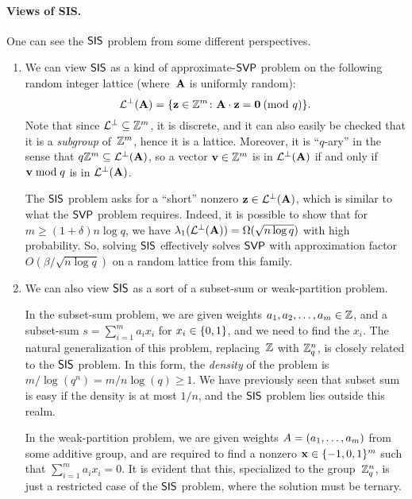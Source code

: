 \documentclass[11pt]{article}
\begin{document}
\paragraph{Views of SIS.}

One can see the $\mathsf{SIS}$ problem from some different perspectives.
\begin{enumerate}
\item We can view $\mathsf{SIS}$ as a kind of approximate-$\mathsf{SVP}$ problem on
  the following random integer lattice (where~$\mathbf{A}$ is uniformly
  random):
  \[ \latperp(\matA) = \set{\vecz \in \Z^{m} \colon \matA \cdot \vecz
      = \veczero \pmod*{q}} . \] Note that since
  $\mathcal{L}^{\perp} \subseteq \mathbb{Z}^{m}$, it is discrete, and it can also easily
  be checked that it is a \emph{subgroup} of~$\mathbb{Z}^{m}$, hence it is a
  lattice. Moreover, it is ``$q$-ary'' in the sense that
  $q\mathbb{Z}^{m} \subseteq \mathcal{L}^{\perp}(\mathbf{A})$, so a vector $\mathbf{v} \in \mathbb{Z}^{m}$
  is in $\mathcal{L}^{\perp}(\mathbf{A})$ if and only if $\mathbf{v} \bmod q$ is in
  $\mathcal{L}^{\perp}(\mathbf{A})$.

  The $\mathsf{SIS}$ problem asks for a ``short'' nonzero
  $\mathbf{z} \in \mathcal{L}^{\perp}(\mathbf{A})$, which is similar to what the $\mathsf{SVP}$
  problem requires. Indeed, it is possible to show that for
  $m \geq (1+\delta) n \log q$, we have
  $\lambda_{1}(\mathcal{L}^{\perp}(\mathbf{A})) = \Omega(\sqrt{n \log q})$ with high
  probability. So, solving $\mathsf{SIS}$ effectively solves $\mathsf{SVP}$ with
  approximation factor $O(\beta/\sqrt{n \log q})$ on a random lattice
  from this family.

\item We can also view $\mathsf{SIS}$ as a sort of a subset-sum or
  weak-partition problem.

  In the subset-sum problem, we are given weights
  $a_{1}, a_{2}, \ldots, a_{m} \in \mathbb{Z}$, and a subset-sum
  $s = \sum_{i=1}^{m} a_i x_i$ for $x_i \in \{0,1\}$, and we need to find
  the $x_i$. The natural generalization of this problem,
  replacing~$\mathbb{Z}$ with $\mathbb{Z}_q^{n}$, is closely related to the $\mathsf{SIS}$
  problem. In this form, the \emph{density} of the problem is
  $m/\log(q^{n}) = m/n\log(q) \geq 1$. We have previously seen that
  subset sum is easy if the density is at most $1/n$, and the $\mathsf{SIS}$
  problem lies outside this realm.

  In the weak-partition problem, we are given weights
  $A = (a_1, \ldots, a_m)$ from some additive group, and are
  required to find a nonzero $\mathbf{x} \in \{-1,0,1\}^{m}$ such that
  $\sum_{i=1}^{m} a_{i} x_{i} = 0$. It is evident that this,
  specialized to the group~$\mathbb{Z}_q^{n}$, is just a restricted case of the
  $\mathsf{SIS}$ problem, where the solution must be ternary.
\end{enumerate}
\end{document}
